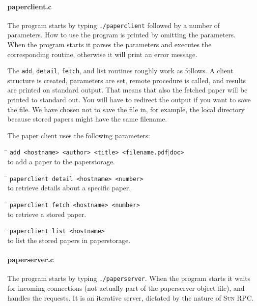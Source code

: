 \documentclass[a4paper,10pt]{article}
\begin{document}
\paragraph{paperclient.c}
The program starts by typing \texttt{./paperclient} followed by a number of
parameters. How to use the program is printed by omitting the
parameters. When the program starts it parses the parameters and
executes the corresponding routine, otherwise it will print an error
message.

The \texttt{add}, \texttt{detail}, \texttt{fetch}, and list routines roughly work as follows. A
client structure is created, parameters are set, remote procedure is
called, and results are printed on standard output. That means that
also the fetched paper will be printed to standard out. You will have
to redirect the output if you want to save the file. We have chosen
not to save the file in, for example, the local directory because
stored papers might have the same filename.

The paper client uses the following parameters:

\begin{tabbing}
\hspace{20pt}\=\kill
 \> \texttt{add <hostname> <author> <title> <filename.}{\texttt{pdf$\vert$doc}}\texttt{>} \\
 \> to add a paper to the paperstorage.
\end{tabbing}

\begin{tabbing}
\hspace{20pt}\=\kill
 \> \texttt{paperclient detail <hostname> <number>} \\
 \> to retrieve details about a specific paper.
\end{tabbing}

\begin{tabbing}
\hspace{20pt}\=\kill
 \> \texttt{paperclient fetch <hostname> <number>} \\
 \> to retrieve a stored paper.
\end{tabbing}

\begin{tabbing}
\hspace{20pt}\=\kill
 \> \texttt{paperclient list <hostname>} \\
 \> to list the stored papers in paperstorage.
\end{tabbing}

\paragraph{paperserver.c}
The program starts by typing \texttt{./paperserver}. When the program starts it
waits for incoming connections (not actually part of the paperserver
object file), and handles the requests. It is an iterative server,
dictated by the nature of \textsc{Sun RPC}.
\end{document}
